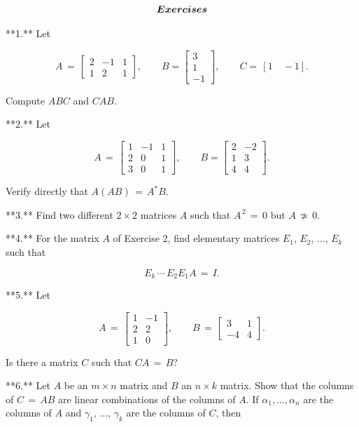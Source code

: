 \[\begin{array}{c}\mbox{\boldmath$Exercises$}\end{array}\]

**1.** Let

\[A\,=\,\begin{bmatrix}2&-1&1\\ 1&2&1\end{bmatrix},\qquad B=\begin{bmatrix}3\\ 1\\ -1\end{bmatrix},\qquad C=\,[1\quad-1].\]

Compute \(ABC\) and \(CAB\).

**2.** Let

\[A\,=\,\begin{bmatrix}1&-1&1\\ 2&0&1\\ 3&0&1\end{bmatrix},\qquad B=\begin{bmatrix}2&-2\\ 1&3\\ 4&4\end{bmatrix}.\]

Verify directly that \(A(AB)\,=\,A^{\ast}B\).

**3.** Find two different \(2\times 2\) matrices \(A\) such that \(A^{\,2}\,=\,0\) but \(A\,\not\simeq\,0\).

**4.** For the matrix \(A\) of Exercise 2, find elementary matrices \(E_{1}\), \(E_{2}\), ..., \(E_{k}\) such that

\[E_{k}\,\cdots\,E_{2}E_{1}A\,=\,I.\]

**5.** Let

\[A\,=\,\begin{bmatrix}1&-1\\ 2&2\\ 1&0\end{bmatrix},\qquad B\,=\,\begin{bmatrix}3&1\\ -4&4\end{bmatrix}.\]

Is there a matrix \(C\) such that \(CA\,=\,B\)?

**6.** Let \(A\) be an \(m\times n\) matrix and \(B\) an \(n\times k\) matrix. Show that the columns of \(C\,=\,AB\) are linear combinations of the columns of \(A\). If \(\alpha_{1},\ldots,\alpha_{n}\) are the columns of \(A\) and \(\gamma_{1}\), ..., \(\gamma_{k}\) are the columns of \(C\), then

